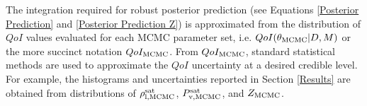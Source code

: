 \documentclass[preprint,letterpaper,floatfix,citeautoscript,aip,jcp]{revtex4-1}
\begin{document}
%
%
The integration required for robust posterior prediction (see Equations \ref{Posterior Prediction} and \ref{Posterior Prediction Z}) is approximated from the distribution of $QoI$ values evaluated for each MCMC parameter set, i.e. $QoI(\theta_{\rm MCMC}|D,M)$ or the more succinct notation $QoI_{\rm MCMC}$. From $QoI_{\rm MCMC}$, standard statistical methods are used to approximate the $QoI$ uncertainty at a desired credible level. For example, the histograms and uncertainties reported in Section \ref{Results} are obtained from distributions of $\rho_{\rm l, MCMC}^{\rm sat}$, $P_{\rm v, MCMC}^{\rm sat}$, and $Z_{\rm MCMC}$.



\end{document}
